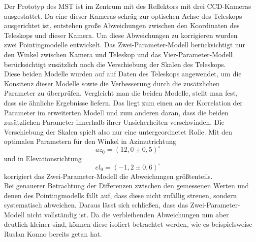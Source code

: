 Der Prototyp des MST ist im Zentrum mit des Reflektors mit drei CCD-Kameras ausgestattet. Da eine dieser Kameras schräg zur optischen Achse des Teleskops ausgerichtet ist, entstehen große Abweichungen zwischen den Koordinaten des Teleskops und dieser Kamera. Um diese Abweichungen zu korrigieren wurden zwei Pointingmodelle entwickelt. Das Zwei-Parameter-Modell berücksichtigt nur den Winkel zwischen Kamera und Teleskop und das Vier-Parameter-Modell berücksichtigt zusätzlich noch die Verschiebung der Skalen des Teleskops.\\
Diese beiden Modelle wurden auf auf Daten des Teleskops angewendet, um die Konsitenz dieser Modelle sowie die Verbesserung durch die zusätzlichen Parameter zu überprüfen. Vergleicht man die beiden Modelle, stellt man fest, dass sie ähnliche Ergebnisse liefern. Das liegt zum einen an der Korrelation der Parameter im erweiterten Modell und zum anderen daran, dass die beiden zusätzlichen Parameter innerhalb ihrer Unsicherheiten verschwinden. Die Verschiebung der Skalen spielt also nur eine untergeordnetet Rolle. Mit den optimalen Parametern für den Winkel in Azimutrichtung $$az_0=(12,0\pm0,5)^{\circ}$$ und in Elevationsrichtung $$el_0=(-1,2\pm0,6)^{\circ}$$ korrigiert das Zwei-Parameter-Modell die Abweichungen größtenteils.\\
Bei genauerer Betrachtung der Differenzen zwischen den gemessenen Werten und denen des Pointingmodells fällt auf, dass diese nicht zufällig streuen, sondern systematisch abweichen. Daraus lässt sich schließen, dass das Zwei-Parameter-Modell nicht vollständig ist. Da die verbleibenden Abweichungen nun aber deutlich kleiner sind, können diese isoliert betrachtet werden, wie es beispielsweise Ruslan Konno \cite{Ruslan} bereits getan hat.
